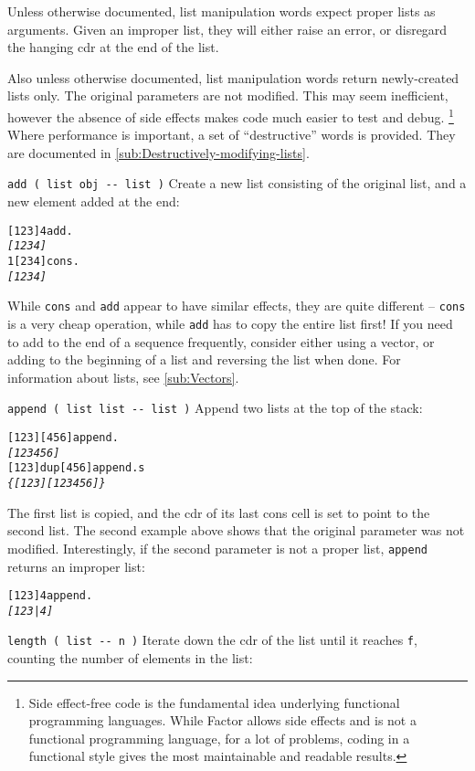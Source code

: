 \documentclass[english]{article}
\begin{document}
Unless otherwise documented, list manipulation words expect proper
lists as arguments. Given an improper list, they will either raise
an error, or disregard the hanging cdr at the end of the list.

Also unless otherwise documented, list manipulation words return newly-created
lists only. The original parameters are not modified. This may seem
inefficient, however the absence of side effects makes code much easier
to test and debug.%
\footnote{Side effect-free code is the fundamental idea underlying functional
programming languages. While Factor allows side effects and is not
a functional programming language, for a lot of problems, coding in
a functional style gives the most maintainable and readable results.%
} Where performance is important, a set of {}``destructive'' words
is provided. They are documented in \ref{sub:Destructively-modifying-lists}.

\texttt{add ( list obj -{}- list )} Create a new list consisting of
the original list, and a new element added at the end:

\begin{alltt}
{[} 1 2 3 {]} 4 add .
\emph{{[} 1 2 3 4 {]}}
1 {[} 2 3 4 {]} cons .
\emph{{[} 1 2 3 4 {]}}
\end{alltt}
While \texttt{cons} and \texttt{add} appear to have similar effects,
they are quite different -- \texttt{cons} is a very cheap operation,
while \texttt{add} has to copy the entire list first! If you need to add to the end of a sequence frequently, consider either using a vector, or adding to the beginning of a list and reversing the list when done. For information about lists, see \ref{sub:Vectors}.

\texttt{append ( list list -{}- list )} Append two lists at the
top of the stack:

\begin{alltt}
{[} 1 2 3 {]} {[} 4 5 6 {]} append .
\emph{{[} 1 2 3 4 5 6 {]}}
{[} 1 2 3 {]} dup {[} 4 5 6 {]} append .s
\emph{\{ {[} 1 2 3 {]} {[} 1 2 3 4 5 6 {]} \}}
\end{alltt}
The first list is copied, and the cdr of its last cons cell is set
to point to the second list. The second example above shows that the original
parameter was not modified. Interestingly, if the second parameter
is not a proper list, \texttt{append} returns an improper list:

\begin{alltt}
{[} 1 2 3 {]} 4 append .
\emph{{[} 1 2 3 | 4 {]}}
\end{alltt}
\texttt{length ( list -{}- n )} Iterate down the cdr of the list until
it reaches \texttt{f}, counting the number of elements in the list:
\end{document}
